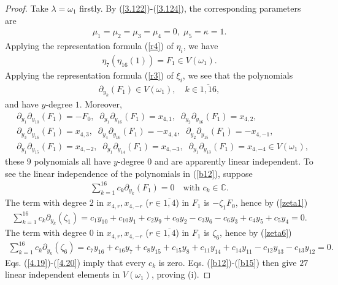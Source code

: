 \documentclass[12pt]{article}
\numberwithin{equation}{section}
\theoremstyle{definition}
\theoremstyle{remark}
\begin{document}
\begin{proof}
	Take $\lambda=\omega_1$ firstly. By (\ref{3.122})-(\ref{3.124}), the corresponding parameters are
	\begin{eqnarray}
		\mu_1=\mu_2=\mu_3=\mu_4=0,\;\mu_5=\kappa=1.
	\end{eqnarray}
	Applying the representation formula (\ref{r4}) of $\eta_i$, we have
	\begin{eqnarray}
		\eta_7(\eta_{16}(1))=F_1\in V(\omega_1).
	\end{eqnarray}
	Applying the representation formula (\ref{r3}) of $\xi_i$, we see that the polynomials
	\begin{eqnarray}
		\partial_{y_k}(F_1)\in V(\omega_1), \quad k\in\overline{1,16}, \label{b12}
	\end{eqnarray}
	and have $y$-degree $1$. Moreover,
	\begin{eqnarray}
		&\partial_{y_1}\partial_{y_{10}}(F_1)=-F_0,\;\;\partial_{y_1}\partial_{y_{16}}(F_1)=x_{4,1},\;\;\partial_{y_2}\partial_{y_{16}}(F_1)=x_{4,2},\label{b13}\\
		&\partial_{y_3}\partial_{y_{16}}(F_1)=x_{4,3},\;\;\partial_{y_4}\partial_{y_{16}}(F_1)=-x_{4,4},\;\;\partial_{y_2}\partial_{y_{15}}(F_1)=-x_{4,-1},\label{b14}\\
		&\partial_{y_1}\partial_{y_{15}}(F_1)=x_{4,-2},\;\;\partial_{y_1}\partial_{y_{14}}(F_1)=x_{4,-3},\;\;\partial_{y_1}\partial_{y_{13}}(F_1)=x_{4,-4} \in V(\omega_1 ),\label{b15}
	\end{eqnarray}
	 these $9$ polynomials all have $y$-degree $0$ and are apparently linear independent. To see the linear independence of the polynomials in (\ref{b12}), suppose 
	 \begin{eqnarray}
	 	\sum_{k=1}^{16}c_k\partial_{y_k}(F_1)=0\quad\text{with }c_k\in\mathbb{C}.
	 \end{eqnarray}
	 The term with degree $2$ in $x_{4,r},x_{4,-r}$ ($r\in\overline{1,4}$) in $F_1$ is $-\zeta_1F_0$, hence by (\ref{zeta1})
	 \begin{eqnarray}
	 	\sum_{k=1}^{16}c_k\partial_{y_k}(\zeta_1)=c_1y_{10}+c_{10}y_1+c_2y_9+c_9y_{2}-c_3y_6-c_6y_3+c_4y_5+c_5y_4=0. \label{4.19}
	 \end{eqnarray}
	 The term with degree $0$ in $x_{4,r},x_{4,-r}$ ($r\in\overline{1,4}$) in $F_1$ is $\zeta_6$, hence by (\ref{zeta6})
	 \begin{align}
	 	\sum_{k=1}^{16}c_k\partial_{y_k}(\zeta_6)=c_7y_{16}+c_{16}y_7+c_8y_{15}+c_{15}y_8+c_{11}y_{14}+c_{14}y_{11}-c_{12}y_{13}-c_{13}y_{12}=0. \label{4.20}
	 \end{align}
	 Eqs. (\ref{4.19})-(\ref{4.20}) imply that every $c_k$ is zero. Eqs. (\ref{b12})-(\ref{b15}) then give $27$ linear independent elements in $V(\omega_1)$, proving (i).
	 

\end{proof}
\end{document}
